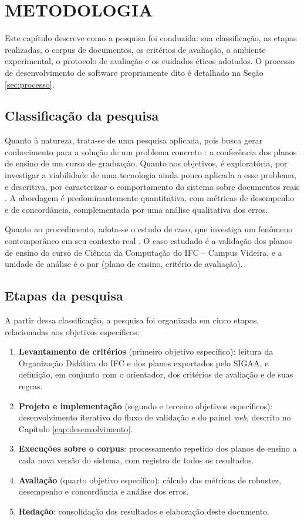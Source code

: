 \chapter{METODOLOGIA}
\label{cap:metodologia}

Este capítulo descreve como a pesquisa foi conduzida: sua classificação, as etapas realizadas, o corpus de documentos, os critérios de avaliação, o ambiente experimental, o protocolo de avaliação e os cuidados éticos adotados. O processo de desenvolvimento de software propriamente dito é detalhado na Seção \ref{sec:processo}.

\section{Classificação da pesquisa}

Quanto à natureza, trata-se de uma pesquisa aplicada, pois busca gerar conhecimento para a solução de um problema concreto \cite{Gil2017}: a conferência dos planos de ensino de um curso de graduação. Quanto aos objetivos, é exploratória, por investigar a viabilidade de uma tecnologia ainda pouco aplicada a esse problema, e descritiva, por caracterizar o comportamento do sistema sobre documentos reais \cite{Gil2017}. A abordagem é predominantemente quantitativa, com métricas de desempenho e de concordância, complementada por uma análise qualitativa dos erros.

Quanto ao procedimento, adota-se o estudo de caso, que investiga um fenômeno contemporâneo em seu contexto real \cite{Yin2015}. O caso estudado é a validação dos planos de ensino do curso de Ciência da Computação do IFC -- Campus Videira, e a unidade de análise é o par (plano de ensino, critério de avaliação).

\section{Etapas da pesquisa}

A partir dessa classificação, a pesquisa foi organizada em cinco etapas, relacionadas aos objetivos específicos:

\begin{enumerate}
    \item \textbf{Levantamento de critérios} (primeiro objetivo específico): leitura da Organização Didática do IFC \cite{ifc2022} e dos planos exportados pelo SIGAA, e definição, em conjunto com o orientador, dos critérios de avaliação e de suas regras.
    \item \textbf{Projeto e implementação} (segundo e terceiro objetivos específicos): desenvolvimento iterativo do fluxo de validação e do painel \textit{web}, descrito no Capítulo \ref{cap:desenvolvimento}.
    \item \textbf{Execuções sobre o corpus}: processamento repetido dos planos de ensino a cada nova versão do sistema, com registro de todos os resultados.
    \item \textbf{Avaliação} (quarto objetivo específico): cálculo das métricas de robustez, desempenho e concordância e análise dos erros.
    \item \textbf{Redação}: consolidação dos resultados e elaboração deste documento.
\end{enumerate}

